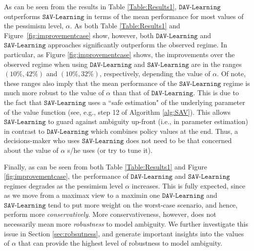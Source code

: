 \documentclass[opre,nonblindrev]{informs2}%
\newcommand{\1}{\hbox{\rm 1\kern-.35em 1}}
\newcommand{\SAV}{\texttt{SAV-Learning}}
\newcommand{\DAV}{\texttt{DAV-Learning}}
\begin{document}
As can be seen from the results in  Table \ref{Table:Results1}, $\DAV$  outperforms $\SAV$ in terms of the mean performance for most values of the pessimism level, $\alpha$. As both  Table \ref{Table:Results1} and Figure~\ref{fig:improvementcase}  show, however, both $\DAV$ and $\SAV$ approaches significantly outperform the observed regime. In particular, as Figure \ref{fig:improvementcase} shows, the improvements over the observed regime when using $\DAV$ and $\SAV$ are in the ranges $(10\%, 42\%)$ and $(10\%, 32\%)$, respectively, depending the value of $\alpha$. Of note, these ranges also imply  that the mean performance of the $\SAV$ regime is much more robust to the value of $\alpha$ than that of $\DAV$. This is due to the fact that $\SAV$ uses a ``safe estimation" of the  underlying parameter of the value function (see, e.g., step 12 of Algorithm \ref{alg:SAV}). This allows $\SAV$ to guard against ambiguity up-front (i.e., in parameter estimation) in contrast to $\DAV$ which combines  policy values at the end. Thus, a decisions-maker who uses $\SAV$ does not need to be that concerned about the value of $\alpha$ s/he uses (or try to tune it).

Finally, as can be seen from both  Table \ref{Table:Results1} and Figure \ref{fig:improvementcase}, the performance of $\DAV$  and $\SAV$ regimes degrades as the pessimism level $\alpha$  increases. This is fully expected, since as we move from a maximax view to a maximin one  $\DAV$  and $\SAV$  tend to put more weight on the worst-case scenario, and hence, perform more {\em conservatively}. More conservativeness, however, does not necessarily mean more {\em robustness} to model ambiguity. We further investigate this issue in Section
\ref{sec:robsutness}, and generate important insights into the values of $\alpha$ that can provide the highest level of robustness to model ambiguity.
\end{document}
